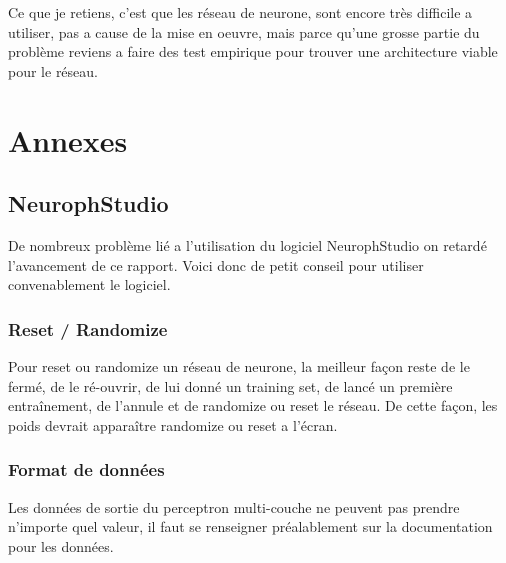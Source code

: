 \documentclass[10pt]{report}
\begin{document}
Ce que je retiens, c'est que les réseau de neurone, sont encore très difficile a utiliser, pas a cause de la mise en oeuvre, mais parce qu'une grosse partie du problème reviens a faire des test empirique pour trouver une architecture viable pour le réseau.

\chapter{Annexes}
\section{NeurophStudio}
De nombreux problème lié a l'utilisation du logiciel NeurophStudio on retardé l'avancement de ce rapport.
Voici donc de petit conseil pour utiliser convenablement le logiciel.
\subsection{Reset / Randomize}
Pour reset ou randomize un réseau de neurone, la meilleur façon reste de le fermé, de le ré-ouvrir, de lui donné un training set, de lancé un première entraînement, de l'annule et de randomize ou reset le réseau. De cette façon, les poids devrait apparaître randomize ou reset a l'écran.
\subsection{Format de données}
Les données de sortie du perceptron multi-couche ne peuvent pas prendre n'importe quel valeur, il faut se renseigner préalablement sur la documentation pour les données.
\end{document}
